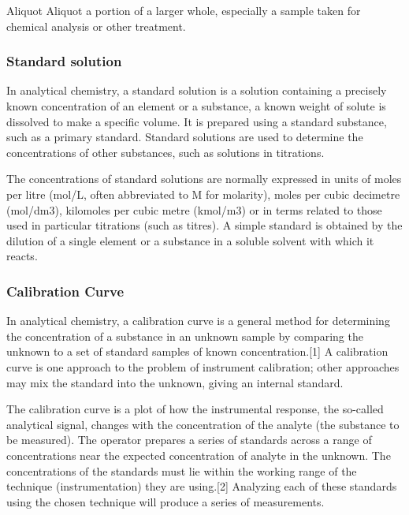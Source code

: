Aliquot
Aliquot a portion of a larger whole, especially a sample taken for chemical analysis or other treatment.



\subsubsection{Standard solution}

In analytical chemistry, a standard solution is a solution containing a precisely known concentration of an element or a substance, a known weight of solute is dissolved to make a specific volume. It is prepared using a standard substance, such as a primary standard. Standard solutions are used to determine the concentrations of other substances, such as solutions in titrations. 

The concentrations of standard solutions are normally expressed in units of moles per litre (mol/L, often abbreviated to M for molarity), moles per cubic decimetre (mol/dm3), kilomoles per cubic metre (kmol/m3) or in terms related to those used in particular titrations (such as titres). A simple standard is obtained by the dilution of a single element or a substance in a soluble solvent with which it reacts.


\subsubsection{Calibration Curve}

In analytical chemistry, a calibration curve is a general method for determining the concentration of a substance in an unknown sample by comparing the unknown to a set of standard samples of known concentration.[1] A calibration curve is one approach to the problem of instrument calibration; other approaches may mix the standard into the unknown, giving an internal standard.


The calibration curve is a plot of how the instrumental response, the so-called analytical signal, changes with the concentration of the analyte (the substance to be measured). The operator prepares a series of standards across a range of concentrations near the expected concentration of analyte in the unknown. The concentrations of the standards must lie within the working range of the technique (instrumentation) they are using.[2] Analyzing each of these standards using the chosen technique will produce a series of measurements. 

